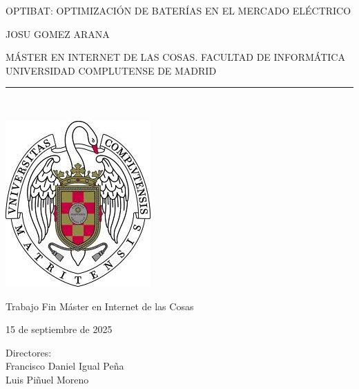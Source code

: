 \newpage

\thispagestyle{empty}

\begin{center}

  \vspace{1cm}

  {\large OPTIBAT\@: OPTIMIZACIÓN DE BATERÍAS EN EL MERCADO ELÉCTRICO}\\

  \vspace{0.5cm}

  \vspace{0.5cm}

  {\large JOSU GOMEZ ARANA}\\

  \vspace{0.5cm}

  MÁSTER EN INTERNET DE LAS COSAS\@. FACULTAD DE INFORMÁTICA\\
  UNIVERSIDAD COMPLUTENSE DE MADRID\\

  \vspace{0.65cm}

  \rule{2in}{0.5pt}\\

  \vspace{0.85cm}

  \includegraphics[height=2.5in]{figures/escudo.jpg}

  \vspace{0.5cm}

  Trabajo Fin Máster en Internet de las Cosas

  \vspace{0.5cm}

  15 de septiembre de 2025\\

  \vspace{1cm}

\end{center}

{
  \raggedleft
  Directores:\\
  \vspace{1cm}
  Francisco Daniel Igual Peña\\
  Luis Piñuel Moreno\\
}
